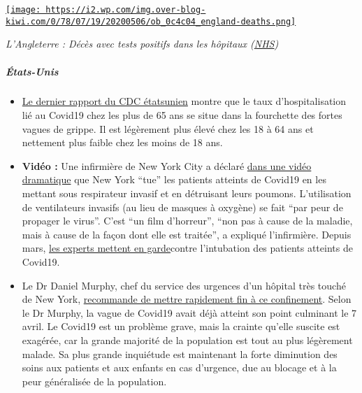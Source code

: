 \href{http://img.over-blog-kiwi.com/0/78/07/19/20200506/ob_0c4c04_england-deaths.png\#width=736\&height=457}{\texttt{[image: https://i2.wp.com/img.over-blog-kiwi.com/0/78/07/19/20200506/ob\_0c4c04\_england-deaths.png]}}

\emph{L'Angleterre : Décès avec tests positifs dans les hôpitaux
(\href{https://www.england.nhs.uk/statistics/statistical-work-areas/covid-19-daily-deaths/}{NHS})}

\hypertarget{uxe9tats-unis}{%
\subparagraph{\texorpdfstring{\textbf{États-Unis}}{États-Unis}}\label{uxe9tats-unis}}

\begin{itemize}
\tightlist
\item
  \href{https://www.cdc.gov/coronavirus/2019-ncov/covid-data/covidview/index.html}{Le
  dernier rapport du CDC étatsunien} montre que le taux
  d'hospitalisation lié au Covid19 chez les plus de 65 ans se situe dans
  la fourchette des fortes vagues de grippe. Il est légèrement plus
  élevé chez les 18 à 64 ans et nettement plus faible chez les moins de
  18 ans.
\item
  \textbf{Vidéo :} Une infirmière de New York City a déclaré
  \href{https://www.dailymail.co.uk/news/article-8262351/Nurse-New-York-claims-city-killing-COVID-19-patients-putting-ventilators.html}{dans
  une vidéo dramatique} que New York ``tue'' les patients atteints de
  Covid19 en les mettant sous respirateur invasif et en détruisant leurs
  poumons. L'utilisation de ventilateurs invasifs (au lieu de masques à
  oxygène) se fait ``par peur de propager le virus''. C'est ``un film
  d'horreur'', ``non pas à cause de la maladie, mais à cause de la façon
  dont elle est traitée'', a expliqué l'infirmière. Depuis mars,
  \href{https://apnews.com/8ccd325c2be9bf454c2128dcb7bd616d}{les experts
  mettent en garde}contre l'intubation des patients atteints de Covid19.
\item
  Le Dr Daniel Murphy, chef du service des urgences d'un hôpital très
  touché de New York,
  \href{https://nypost.com/2020/04/27/ive-worked-the-coronavirus-front-line-and-i-say-its-time-to-start-opening-up/}{recommande
  de mettre rapidement fin à ce confinement}. Selon le Dr Murphy, la
  vague de Covid19 avait déjà atteint son point culminant le 7 avril. Le
  Covid19 est un problème grave, mais la crainte qu'elle suscite est
  exagérée, car la grande majorité de la population est tout au plus
  légèrement malade. Sa plus grande inquiétude est maintenant la forte
  diminution des soins aux patients et aux enfants en cas d'urgence, due
  au blocage et à la peur généralisée de la population.
\end{itemize}

